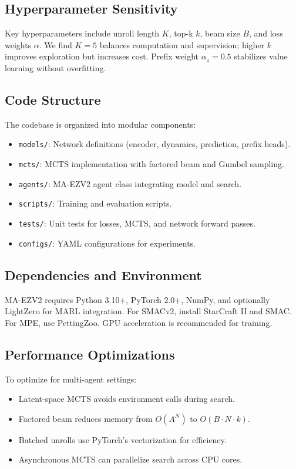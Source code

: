 \documentclass[10pt]{article}
\begin{document}
\subsection{Hyperparameter Sensitivity}
Key hyperparameters include unroll length $K$, top-k $k$, beam size $B$, and loss weights $\alpha$. We find $K=5$ balances computation and supervision; higher $k$ improves exploration but increases cost. Prefix weight $\alpha_z=0.5$ stabilizes value learning without overfitting.

\subsection{Code Structure}
The codebase is organized into modular components:
\begin{itemize}
  \item \texttt{models/}: Network definitions (encoder, dynamics, prediction, prefix heads).
  \item \texttt{mcts/}: MCTS implementation with factored beam and Gumbel sampling.
  \item \texttt{agents/}: MA-EZV2 agent class integrating model and search.
  \item \texttt{scripts/}: Training and evaluation scripts.
  \item \texttt{tests/}: Unit tests for losses, MCTS, and network forward passes.
  \item \texttt{configs/}: YAML configurations for experiments.
\end{itemize}

\subsection{Dependencies and Environment}
MA-EZV2 requires Python 3.10+, PyTorch 2.0+, NumPy, and optionally LightZero for MARL integration. For SMACv2, install StarCraft II and SMAC. For MPE, use PettingZoo. GPU acceleration is recommended for training.

\subsection{Performance Optimizations}
To optimize for multi-agent settings:
\begin{itemize}
  \item Latent-space MCTS avoids environment calls during search.
  \item Factored beam reduces memory from $O(A^N)$ to $O(B \cdot N \cdot k)$.
  \item Batched unrolls use PyTorch's vectorization for efficiency.
  \item Asynchronous MCTS can parallelize search across CPU cores.
\end{itemize}
\end{document}
